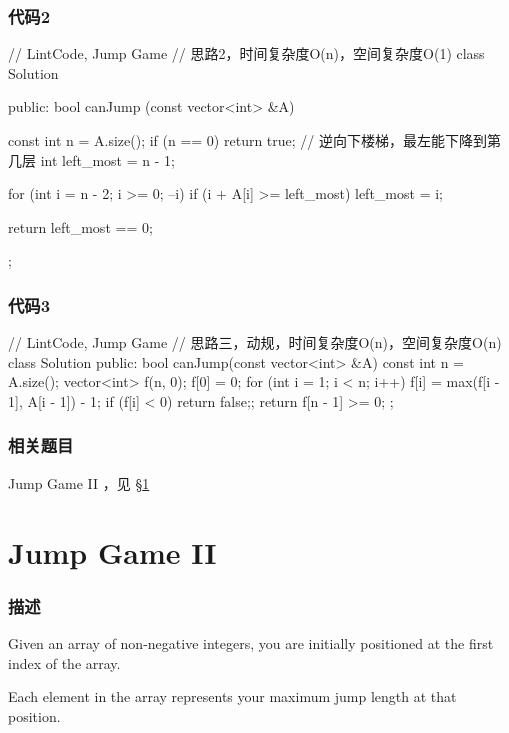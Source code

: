 \subsubsection{代码2}
\begin{Code}
// LintCode, Jump Game
// 思路2，时间复杂度O(n)，空间复杂度O(1)
class Solution {
public:
    bool canJump (const vector<int> &A) {
        const int n = A.size();
        if (n == 0) return true;
        // 逆向下楼梯，最左能下降到第几层
        int left_most = n - 1;

        for (int i = n - 2; i >= 0; --i)
            if (i + A[i] >= left_most)
                left_most = i;

        return left_most == 0;
    }
};
\end{Code}


\subsubsection{代码3}
\begin{Code}
// LintCode, Jump Game
// 思路三，动规，时间复杂度O(n)，空间复杂度O(n)
class Solution {
public:
    bool canJump(const vector<int> &A) {
        const int n = A.size();
        vector<int> f(n, 0);
        f[0] = 0;
        for (int i = 1; i < n; i++) {
            f[i] = max(f[i - 1], A[i - 1]) - 1;
            if (f[i] < 0) return false;;
        }
        return f[n - 1] >= 0;
    }
};
\end{Code}


\subsubsection{相关题目}
\begindot
\item Jump Game II ，见 \S \ref{sec:jump-game-ii}
\myenddot


\section{Jump Game II} %
\label{sec:jump-game-ii}


\subsubsection{描述}
Given an array of non-negative integers, you are initially positioned at the first index of the array.

Each element in the array represents your maximum jump length at that position.

